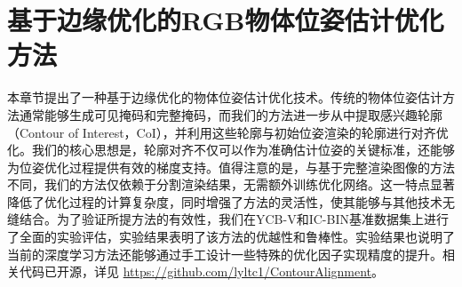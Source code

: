 \chapter{基于边缘优化的RGB物体位姿估计优化方法}

本章节提出了一种基于边缘优化的物体位姿估计优化技术。传统的物体位姿估计方法通常能够生成可见掩码和完整掩码，而我们的方法进一步从中提取感兴趣轮廓（Contour of Interest，CoI），并利用这些轮廓与初始位姿渲染的轮廓进行对齐优化。我们的核心思想是，轮廓对齐不仅可以作为准确估计位姿的关键标准，还能够为位姿优化过程提供有效的梯度支持。值得注意的是，与基于完整渲染图像的方法不同，我们的方法仅依赖于分割渲染结果，无需额外训练优化网络。这一特点显著降低了优化过程的计算复杂度，同时增强了方法的灵活性，使其能够与其他技术无缝结合。为了验证所提方法的有效性，我们在YCB-V和IC-BIN基准数据集上进行了全面的实验评估，实验结果表明了该方法的优越性和鲁棒性。实验结果也说明了当前的深度学习方法还能够通过手工设计一些特殊的优化因子实现精度的提升。相关代码已开源，详见 \href{https://github.com/lyltc1/ContourAlignment}{https://github.com/lyltc1/ContourAlignment}。

